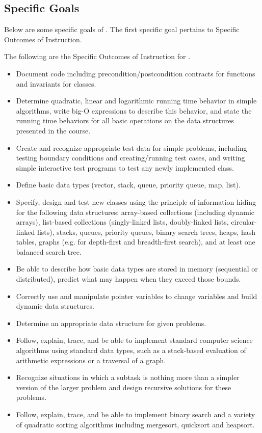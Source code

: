 \subsection{Specific Goals}
Below are some specific goals of \CSPBDataStruct. The first specific goal pertains to Specific Outcomes of Instruction.
\begin{solution}
\noindent The following are the Specific Outcomes of Instruction for \CSPBDataStruct.
    \begin{itemize}
        \item Document code including precondition/postcondition contracts for functions and invariants for classes.
        \item Determine quadratic, linear and logarithmic running time behavior in simple algorithms, write big-O expressions to describe this behavior, and state the running time behaviors for all basic operations on the data structures presented in the course.
        \item Create and recognize appropriate test data for simple problems, including testing boundary conditions and creating/running test cases, and writing simple interactive test programs to test any newly implemented class.
        \item Define basic data types (vector, stack, queue, priority queue, map, list).
        \item Specify, design and test new classes using the principle of information hiding for the following data structures: array-based collections (including dynamic arrays), list-based collections (singly-linked lists, doubly-linked lists, circular-linked lists), stacks, queues, priority queues, binary search trees, heaps, hash tables, graphs (e.g. for depth-first and breadth-first search), and at least one balanced search tree.
        \item Be able to describe how basic data types are stored in memory (sequential or distributed), predict what may happen when they exceed those bounds.
        \item Correctly use and manipulate pointer variables to change variables and build dynamic data structures.
        \item Determine an appropriate data structure for given problems.
        \item Follow, explain, trace, and be able to implement standard computer science algorithms using standard data types, such as a stack-based evaluation of arithmetic expressions or a traversal of a graph.
        \item Recognize situations in which a subtask is nothing more than a simpler version of the larger problem and design recursive solutions for these problems.
        \item Follow, explain, trace, and be able to implement binary search and a variety of quadratic sorting algorithms including mergesort, quicksort and heapsort.
    \end{itemize}
\end{solution}

